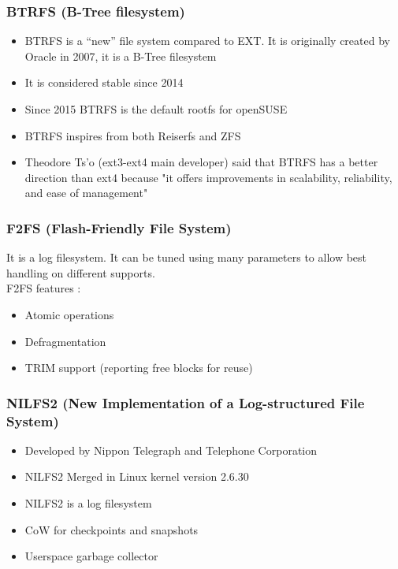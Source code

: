 \documentclass[resume]{subfiles}
\begin{document}
\subsubsection{BTRFS (B-Tree filesystem)}
\begin{itemize}
    \item BTRFS is a “new” file system compared to EXT. It is originally created by Oracle in 2007, it is a B-Tree filesystem
    \item It is considered stable since 2014
    \item Since 2015 BTRFS is the default rootfs for openSUSE
    \item BTRFS inspires from both Reiserfs and ZFS
    \item Theodore Ts’o (ext3-ext4 main developer) said that BTRFS has a better direction than ext4 because "it offers improvements in scalability, reliability, and ease of management"
\end{itemize}

\subsubsection{F2FS (Flash-Friendly File System)}
It is a log filesystem. It can be tuned using many parameters to allow best handling on different supports.\\
F2FS features :
\begin{itemize}
    \item Atomic operations
    \item Defragmentation
    \item TRIM support (reporting free blocks for reuse)
\end{itemize}

\subsubsection{NILFS2 (New Implementation of a Log-structured File System)}
\begin{itemize}
    \item Developed by Nippon Telegraph and Telephone Corporation
    \item NILFS2 Merged in Linux kernel version 2.6.30
    \item NILFS2 is a log filesystem
    \item CoW for checkpoints and snapshots
    \item Userspace garbage collector
\end{itemize}
\end{document}
